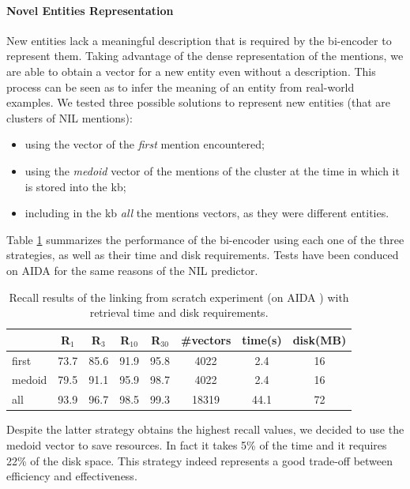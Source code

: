 \paragraph{Novel Entities Representation}

New entities lack a meaningful description that is required by the bi-encoder to represent them. Taking advantage of the dense representation of the mentions, we are able to obtain a vector for a new entity even without a description.
This process can be seen as to infer the meaning of an entity from real-world examples.
We tested three possible solutions to represent new entities (that are clusters of NIL mentions):
\begin{itemize}
    \item using the vector of the \textit{first} mention encountered;
    \item using the \textit{medoid} vector of the mentions of the cluster at the time in which it is stored into the \ac{kb};
    \item including in the \ac{kb} \textit{all} the mentions vectors, as they were different entities.
\end{itemize}

Table \ref{tab:new_entities_recall} summarizes the performance of the bi-encoder using each one of the three strategies, as well as their time and disk requirements. Tests have been conduced on AIDA for the same reasons of the NIL predictor.
\begin{table}
    \centering
    \caption{Recall results of the linking from scratch experiment (on AIDA \cite{aida}) with retrieval time and disk requirements.
    }
    \begin{tabular}{l|cccc|ccc}
         &  R$_{1}$ & R$_{3}$ & R$_{10}$ & R$_{30}$ & \#vectors & time(s) & disk(MB) \\
         \hline
         first  & 73.7 & 85.6 & 91.9 & 95.8 &  4022 &  2.4 & 16\\
         medoid & 79.5 & 91.1 & 95.9 & 98.7 &  4022 &  2.4 & 16\\
         all    & 93.9 & 96.7 & 98.5 & 99.3 &  18319 &  44.1 & 72
    \end{tabular}
    \label{tab:new_entities_recall}
\end{table}

Despite the latter strategy obtains the highest recall values, we decided to use the medoid vector to save resources. In fact it takes 5\% of the time and it requires 22\% of the disk space. This strategy indeed represents a good trade-off between efficiency 
and effectiveness.


